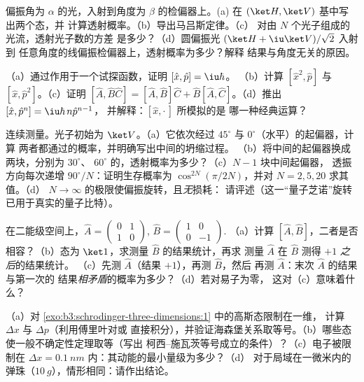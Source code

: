 \begin{exercise}[$\star$]\label{exo:b3:quantum-formalism:3}
偏振角为 $\alpha$ 的光，入射到角度为
$\beta$ 的检偏器上。(a) 在 $(\ket H, \ket V)$ 基中写出两个态，并
计算透射概率。（b）导出马吕斯定律。（c）
对由 $N$ 个光子组成的光流，透射光子数的方差
是多少？（d）圆偏振光 $(\ket H + \iu\ket V)/\sqrt2$ 入射到
任意角度的线偏振检偏器上，透射概率为多少？解释
结果与角度无关的原因。
\end{exercise}

\begin{exercise}[$\star$]\label{exo:b3:quantum-formalism:4}
（a）通过作用于一个试探函数，证明 $[\hat x, \hat p] = \iu\hbar$。
（b）计算 $[\hat x^2, \hat p]$ 与 $[\hat x, \hat p^2]$。（c）证明
$[\hat A, \hat B\hat C] = [\hat A, \hat B]\hat C + \hat B[\hat A,
\hat C]$。（d）推出 $[\hat x, \hat p^n] = \iu\hbar\,n\hat p^{n-1}$，
并解释：$[\hat x, \cdot\,]$ 所模拟的是
哪一种经典运算？
\end{exercise}

\begin{exercise}[$\star\star$]\label{exo:b3:quantum-formalism:5}
连续测量。光子初始为 $\ket V$。（a）它依次经过
$45^\circ$ 与 $0^\circ$（水平）的起偏器，计算
两者都通过的概率，并明确写出中间的坍缩过程。
（b）将中间的起偏器换成两块，分别为 $30^\circ$、
$60^\circ$ 的，透射概率为多少？（c）$N - 1$ 块中间起偏器，
透振方向每次递增 $90^\circ/N$：证明生存概率为
$\cos^{2N}(\pi/2N)$，并对 $N = 2, 5, 20$ 求其值。（d）
$N \to \infty$ 的极限使偏振旋转，且\emph{无}损耗：
请评述（这一“量子芝诺”旋转已用于真实的量子比特）。
\end{exercise}

\begin{exercise}[$\star\star$]\label{exo:b3:quantum-formalism:6}
在二能级空间上，$\hat A = \begin{pmatrix}0&1\\1&0
\end{pmatrix}$, $\hat B = \begin{pmatrix}1&0\\0&-1\end{pmatrix}$.
（a）计算 $[\hat A, \hat B]$，二者是否相容？（b）态为
$\ket1$，求测量 $\hat B$ 的结果统计，再求
测量 $\hat A$ 在 $\hat B$ 测得 $+1$ \emph{之后}的结果统计。
（c）先测 $\hat A$（结果 $+1$），再测 $\hat B$，然后
再测 $\hat A$：末次 $\hat A$ 的结果与第一次的
结果\emph{相矛盾}的概率为多少？（d）若对易子为零，
这对（c）意味着什么？
\end{exercise}

\begin{exercise}[$\star\star$]\label{exo:b3:quantum-formalism:7}
（a）对
\cref{exo:b3:schrodinger-three-dimensions:1} 中的高斯态限制在一维，
计算 $\Delta x$ 与 $\Delta p$（利用傅里叶对或
直接积分），并验证海森堡关系取等号。（b）哪些态
使一般不确定性定理取等（写出
柯西–施瓦茨等号成立的条件）？（c）电子被限制在
$\Delta x = \qty{0.1}{nm}$ 内：其动能的最小量级为多少？（d）
对于局域在一微米内的弹珠（$\qty{10}{g}$），情形相同：请作出结论。
\end{exercise}

